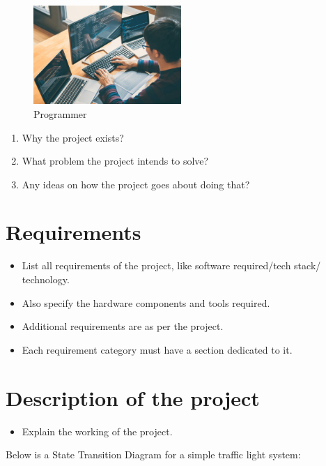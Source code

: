 \documentclass[
  12pt,
  a4paper,
  option1,
  option2]{report}
\providecommand{\tightlist}{%
  \setlength{\itemsep}{0pt}\setlength{\parskip}{0pt}}
\begin{document}
\begin{figure}
\centering
\includegraphics[width=0.5\textwidth,height=0.5\textheight]{./markdown/Me2.jpg}
\caption{Programmer}
\end{figure}

\begin{enumerate}
\def\labelenumi{\arabic{enumi}.}
\tightlist
\item
  Why the project exists?
\item
  What problem the project intends to solve?
\item
  Any ideas on how the project goes about doing that?
\end{enumerate}
\chapter{Requirements}\label{sec:Requirements}

\begin{itemize}
\item
  List all requirements of the project, like software required/tech
  stack/ technology.
\item
  Also specify the hardware components and tools required.
\item
  Additional requirements are as per the project.
\item
  Each requirement category must have a section dedicated to it.
\end{itemize}

\chapter{Description of the project}\label{sec:Project}

\begin{itemize}
\tightlist
\item
  Explain the working of the project.
\end{itemize}

Below is a State Transition Diagram for a simple traffic light system:
\end{document}
